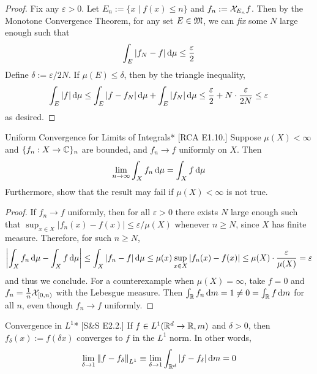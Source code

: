 \begin{proof}
    Fix any \(\varepsilon > 0\). Let \(E_n := \{x \mid f(x) \leq n\}\) and \(f_n := \mathcal{X}_{E_n}f\). Then by the Monotone Convergence Theorem, for any set \(E \in \mathfrak{M}\), we can \textit{fix} some \(N\) large enough such that
    \[
    \int_E |f_N - f| \, \mathrm{d}\mu \leq \frac{\varepsilon}{2}
    \]
    Define \(\delta := \varepsilon / 2N\). If \(\mu(E) \leq \delta\), then by the triangle inequality, 
    \[
    \int_E |f| \, \mathrm{d}\mu 
    \leq \int_E |f - f_N| \, \mathrm{d}\mu + \int_E |f_N| \, \mathrm{d}\mu
    \leq \frac{\varepsilon}{2} + N \cdot \frac{\varepsilon}{2N}
    \leq \varepsilon
    \]
    as desired. 
\end{proof}

\begin{problem}{Uniform Convergence for Limits of Integrals}*
    [RCA E1.10.] Suppose \(\mu(X) < \infty\) and \(\{f_n : X \to \mathbb{C}\}_n\) are bounded, and \(f_n \to f\) uniformly on \(X\). Then 
    \[
    \lim_{n \to \infty} \int_X f_n \, \mathrm{d}\mu = \int_X f \, \mathrm{d}\mu
    \]
    Furthermore, show that the result may fail if \(\mu(X) < \infty\) is not true. 
\end{problem}

\begin{proof}
    If \(f_n \to f\) uniformly, then for all \(\varepsilon > 0\) there exists \(N\) large enough such that \(\sup_{x \in X} |f_n(x) - f(x)| \leq \varepsilon / \mu(X)\) whenever \(n \geq N\), since \(X\) has finite measure. Therefore, for such \(n \geq N\), 
    \[
    \left| \int_X f_n \, \mathrm{d}\mu - \int_X f \, \mathrm{d}\mu \right| 
    \leq \int_X |f_n - f| \, \mathrm{d}\mu 
    \leq \mu(x) \sup_{x \in X} |f_n(x) - f(x)|
    \leq \mu(X) \cdot \frac{\varepsilon}{\mu(X)}
    = \varepsilon
    \]
    and thus we conclude. For a counterexample when \(\mu(X) = \infty\), take \(f = 0\) and \(f_n = \frac{1}{n} \mathcal{X}_{[0, n)}\) with the Lebesgue measure. Then \(\int_{\mathbb{R}} f_n \, \mathrm{d}m = 1 \neq 0 = \int_{\mathbb{R}} f \, \mathrm{d}m \) for all \(n\), even though \(f_n \to f\) uniformly. 
\end{proof}

\begin{problem}{Convergence in \(L^1\)}*
    [S\&S E2.2.] If \(f \in L^1(\mathbb{R}^d \to \mathbb{R}, m)\) and \(\delta > 0\), then \(f_\delta(x) := f(\delta x)\) converges to \(f\) in the \(L^1\) norm. In other words, 
    \[
    \lim_{\delta \to 1} \norm{ f - f_\delta }_{L^1} 
    \equiv \lim_{\delta \to 1} \int_{\mathbb{R}^d} |f - f_\delta| \, \mathrm{d}m = 0
    \]
\end{problem}

